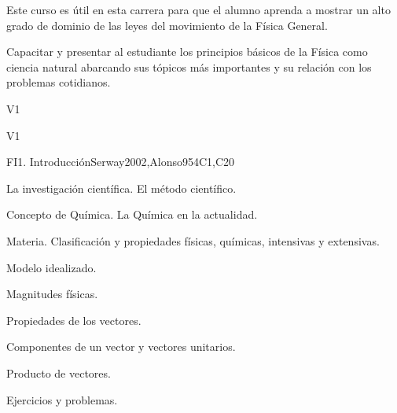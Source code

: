 \begin{syllabus}


\begin{justification}

Este curso es útil en esta carrera para que el alumno aprenda a mostrar un alto grado de dominio de las leyes del movimiento de la Física General.

\end{justification}

\begin{goals}
\item Capacitar y presentar al estudiante los principios básicos de la Física como ciencia natural abarcando sus tópicos más importantes y su relación con los problemas cotidianos.
\end{goals}

\begin{outcomes}{V1}
  \item {}
  \item {}
  \item {}
\end{outcomes}

\begin{competences}{V1}
    \item {}
    \item {}
\end{competences}

\begin{unit}{FI1. Introducción}{}{Serway2002,Alonso95}{4}{C1,C20}
\begin{topics}
      \item La investigación científica. El método científico.
      \item Concepto de Química. La Química en la actualidad.
      \item Materia. Clasificación y propiedades físicas, químicas, intensivas y extensivas.
      \item Modelo idealizado.
      \item Magnitudes físicas.
      \item Propiedades de los vectores.
      \item Componentes de un vector y vectores unitarios.
      \item Producto de vectores.
      \item Ejercicios y problemas.
   \end{topics}


\end{unit}
\end{syllabus}

